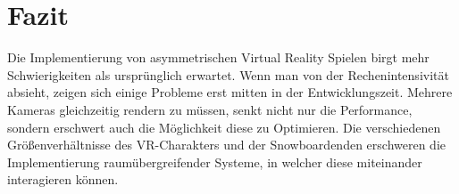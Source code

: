\chapter{Fazit}
Die Implementierung von asymmetrischen Virtual Reality Spielen birgt mehr Schwierigkeiten als ursprünglich erwartet. Wenn man von der Rechenintensivität absieht, zeigen sich einige Probleme erst mitten in der Entwicklungszeit. Mehrere Kameras gleichzeitig rendern zu müssen, senkt nicht nur die Performance, sondern erschwert auch die Möglichkeit diese zu Optimieren. Die verschiedenen Größenverhältnisse des VR-Charakters und der Snowboardenden erschweren die Implementierung raumübergreifender Systeme, in welcher diese miteinander interagieren können.
